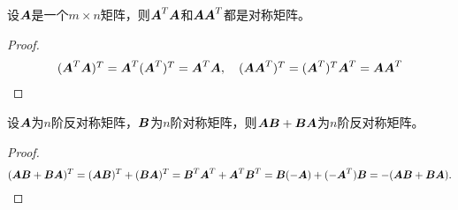 \begin{frame}
\begin{li}
  设$\MA$是一个$m\times n$矩阵，则$\MA^T\MA$和$\MA\MA^T$都是对称矩阵。      
\end{li} \pause 

\begin{proof}
  $$
  \begin{array}{l}
    (\MA^T\MA)^T  = \MA^T(\MA^T)^T  = \MA^T \MA, \quad
    (\MA\MA^T)^T  = (\MA^T)^T\MA^T  = \MA \MA^T
  \end{array}
  $$
\end{proof}
\end{frame}

\begin{frame}
\begin{li}
  设$\MA$为$n$阶反对称矩阵，$\MB$为$n$阶对称矩阵，则$\MA\MB+\MB\MA$为$n$阶反对称矩阵。
\end{li}\pause 

\begin{proof}
  $$
  (\MA\MB+\MB\MA)^T =(\MA\MB)^T+(\MB\MA)^T  = \MB^T\MA^T+\MA^T\MB^T 
  = \MB(-\MA) + (-\MA^T)\MB  = - (\MA\MB+\MB\MA).      
  $$  
\end{proof}%

\end{frame}
